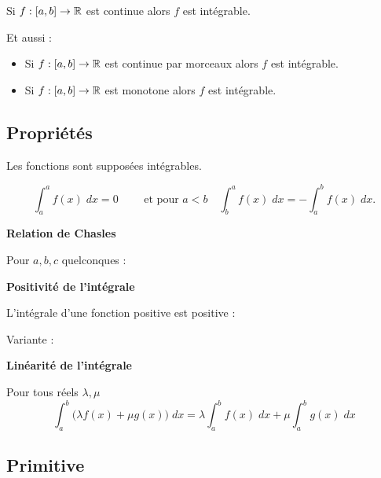 \documentclass[10pt,class=article,crop=false]{standalone}
\begin{document}
\begin{multicols}{2}
\begin{theoreme}
	Si $f : [a,b] \to \mathbb{R}$ est continue alors $f$ est intégrable.
\end{theoreme}
Et aussi :
\begin{itemize}
  \item Si $f : [a,b] \to \mathbb{R}$ est continue par morceaux alors $f$ est intégrable.
  \item Si $f : [a,b] \to \mathbb{R}$ est monotone alors $f$ est intégrable.
\end{itemize}

\subsection{Propriétés}

Les fonctions sont supposées intégrables.

$$\int_a^a f(x) \;dx=0 \qquad \text{ et pour } a<b  \quad \int_b^a f(x) \;dx= -\int_a^b f(x) \; dx.$$

\textbf{Relation de Chasles}

Pour $a,b,c$ quelconques :


\textbf{Positivité de l'intégrale}

\begin{proposition}

\end{proposition}

L'intégrale d'une fonction positive est positive :

Variante :
	
	
\textbf{Linéarité de l'intégrale}
\label{ssec:int23}

Pour tous réels $\lambda,\mu$
$$\int_a^b \big(\lambda f(x)+\mu g(x)\big)\;dx= \lambda\int_a^b f(x)\;dx+\mu\int_a^b g(x)\;dx$$
		




\subsection{Primitive}


\end{multicols}
\end{document}
